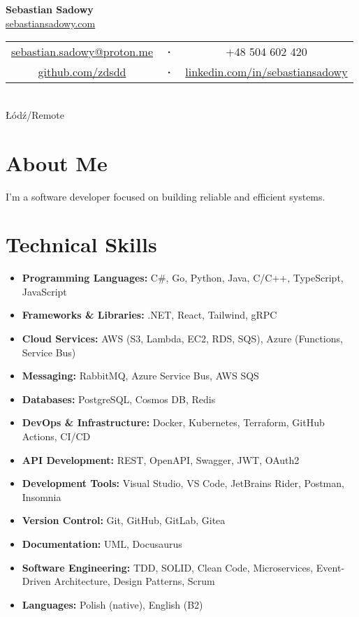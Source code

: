 \documentclass[a4paper,10pt]{article}
\begin{document}
\begin{center}
    {\Huge\textbf{Sebastian Sadowy}} \\[0.3cm]
    \href{https://sebastiansadowy.com}{sebastiansadowy.com} \\[0.2cm]
    \begin{tabular}{c c c}
        \href{mailto:sebastian.sadowy@proton.me}{sebastian.sadowy@proton.me} & 
        \textbf{·} & 
        +48 504 602 420 \\
        \href{https://github.com/zdsdd}{github.com/zdsdd} &
        \textbf{·} &
        \href{https://www.linkedin.com/in/sebastiansadowy}{linkedin.com/in/sebastiansadowy}
    \end{tabular} \\
    Łódź/Remote

\end{center}


\section{About Me}
I'm a software developer focused on building reliable and efficient systems.

\section{Technical Skills}
\begin{itemize}[leftmargin=0.5cm, itemsep=6pt, label=\textbullet]
    \item \textbf{Programming Languages:} C\#, Go, Python, Java, C/C++, TypeScript, JavaScript
    \item \textbf{Frameworks \& Libraries:} .NET, React, Tailwind, gRPC
    \item \textbf{Cloud Services:} AWS (S3, Lambda, EC2, RDS, SQS), Azure (Functions, Service Bus)
    \item \textbf{Messaging:} RabbitMQ, Azure Service Bus, AWS SQS
    \item \textbf{Databases:} PostgreSQL, Cosmos DB, Redis
    \item \textbf{DevOps \& Infrastructure:} Docker, Kubernetes, Terraform, GitHub Actions, CI/CD
    \item \textbf{API Development:} REST, OpenAPI, Swagger, JWT, OAuth2
    \item \textbf{Development Tools:} Visual Studio, VS Code, JetBrains Rider, Postman, Insomnia
    \item \textbf{Version Control:} Git, GitHub, GitLab, Gitea
    \item \textbf{Documentation:} UML, Docusaurus
    \item \textbf{Software Engineering:} TDD, SOLID, Clean Code, Microservices, Event-Driven Architecture, Design Patterns, Scrum
    \item \textbf{Languages:} Polish (native), English (B2)
\end{itemize}
\end{document}
